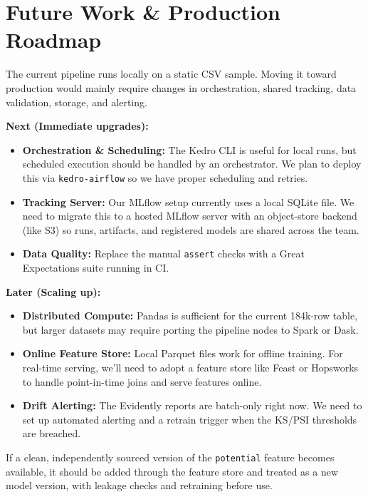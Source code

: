 \documentclass[11pt,a4paper]{article}
\newcommand{\code}[1]{\texttt{\small #1}}
\begin{document}
\section{Future Work \& Production Roadmap}
The current pipeline runs locally on a static CSV sample. Moving it toward production would mainly require changes in orchestration, shared tracking, data validation, storage, and alerting.

\textbf{Next (Immediate upgrades):}
\begin{itemize}
    \item \textbf{Orchestration \& Scheduling:} The Kedro CLI is useful for local runs, but scheduled execution should be handled by an orchestrator. We plan to deploy this via \code{kedro-airflow} so we have proper scheduling and retries.
    \item \textbf{Tracking Server:} Our MLflow setup currently uses a local SQLite file. We need to migrate this to a hosted MLflow server with an object-store backend (like S3) so runs, artifacts, and registered models are shared across the team.
    \item \textbf{Data Quality:} Replace the manual \code{assert} checks with a Great Expectations suite running in CI.
\end{itemize}

\textbf{Later (Scaling up):}
\begin{itemize}
    \item \textbf{Distributed Compute:} Pandas is sufficient for the current 184k-row table, but larger datasets may require porting the pipeline nodes to Spark or Dask.
    \item \textbf{Online Feature Store:} Local Parquet files work for offline training. For real-time serving, we'll need to adopt a feature store like Feast or Hopsworks to handle point-in-time joins and serve features online.
    \item \textbf{Drift Alerting:} The Evidently reports are batch-only right now. We need to set up automated alerting and a retrain trigger when the KS/PSI thresholds are breached.
\end{itemize}

If a clean, independently sourced version of the \code{potential} feature becomes available, it should be added through the feature store and treated as a new model version, with leakage checks and retraining before use.
\end{document}
